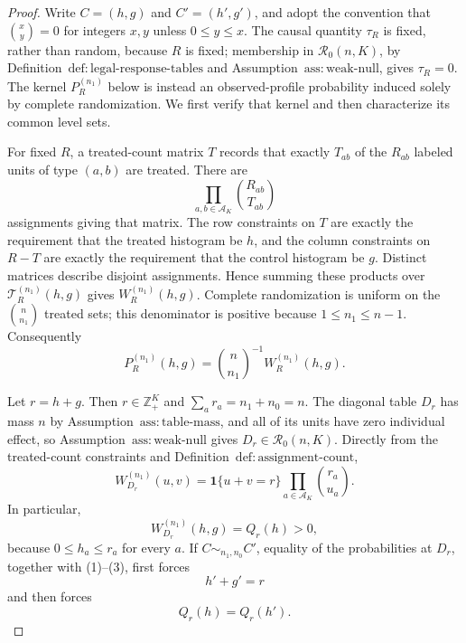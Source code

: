 \documentclass{article}
\begin{document}
\begin{proof}
Write \(C=(h,g)\) and \(C'=(h',g')\), and adopt the convention that \(\binom{x}{y}=0\) for integers \(x,y\) unless \(0\leq y\leq x\).  The causal quantity \(\tau_R\) is fixed, rather than random, because \(R\) is fixed; membership in \(\mathcal R_0(n,K)\), by Definition~\(\mathrm{def:legal\mbox{-}response\mbox{-}tables}\) and Assumption~\(\mathrm{ass:weak\mbox{-}null}\), gives \(\tau_R=0\).  The kernel \(P_R^{(n_1)}\) below is instead an observed-profile probability induced solely by complete randomization.  We first verify that kernel and then characterize its common level sets.

For fixed \(R\), a treated-count matrix \(T\) records that exactly \(T_{ab}\) of the \(R_{ab}\) labeled units of type \((a,b)\) are treated.  There are
\[
 \prod_{a,b\in\mathcal A_K}\binom{R_{ab}}{T_{ab}}
\]
assignments giving that matrix.  The row constraints on \(T\) are exactly the requirement that the treated histogram be \(h\), and the column constraints on \(R-T\) are exactly the requirement that the control histogram be \(g\).  Distinct matrices describe disjoint assignments.  Hence summing these products over \(\mathcal T_R^{(n_1)}(h,g)\) gives \(W_R^{(n_1)}(h,g)\).  Complete randomization is uniform on the \(\binom n{n_1}\) treated sets; this denominator is positive because \(1\leq n_1\leq n-1\).  Consequently
\[
 P_R^{(n_1)}(h,g)=\binom n{n_1}^{-1}W_R^{(n_1)}(h,g).
 \tag{1}
\]

Let \(r=h+g\).  Then \(r\in\mathbb Z_+^K\) and \(\sum_a r_a=n_1+n_0=n\).  The diagonal table \(D_r\) has mass \(n\) by Assumption~\(\mathrm{ass:table\mbox{-}mass}\), and all of its units have zero individual effect, so Assumption~\(\mathrm{ass:weak\mbox{-}null}\) gives \(D_r\in\mathcal R_0(n,K)\).  Directly from the treated-count constraints and Definition~\(\mathrm{def:assignment\mbox{-}count}\),
\[
 W_{D_r}^{(n_1)}(u,v)
 =\mathbf 1\{u+v=r\}\prod_{a\in\mathcal A_K}\binom{r_a}{u_a}.
 \tag{2}
\]
In particular,
\[
 W_{D_r}^{(n_1)}(h,g)=Q_r(h)>0,
 \tag{3}
\]
because \(0\leq h_a\leq r_a\) for every \(a\).  If \(C\sim_{n_1,n_0}C'\), equality of the probabilities at \(D_r\), together with (1)--(3), first forces
\[
 h'+g'=r
 \tag{4}
\]
and then forces
\[
 Q_r(h)=Q_r(h').
 \tag{5}
\]


\end{proof}
\end{document}
